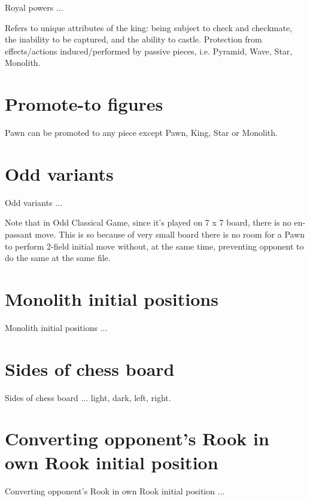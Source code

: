 Royal powers ...

    Refers to unique attributes of the king: being subject to check and checkmate, the inability to be captured, and the ability to castle.
    Protection from effects/actions induced/performed by passive pieces, i.e. Pyramid, Wave, Star, Monolith.


\section*{Promote-to figures}

Pawn can be promoted to any piece except Pawn, King, Star or Monolith.

\section*{Odd variants}

Odd variants ...

Note that in Odd Classical Game, since it's played on 7 x 7 board,
there is no en-passant move. This is so because of very small board
there is no room for a Pawn to perform 2-field initial move without,
at the same time, preventing opponent to do the same at the same file.

\section*{Monolith initial positions}

Monolith initial positions ...

\section*{Sides of chess board}

Sides of chess board ... light, dark, left, right.

\section*{Converting opponent's Rook in own Rook initial position}

Converting opponent's Rook in own Rook initial position ...

